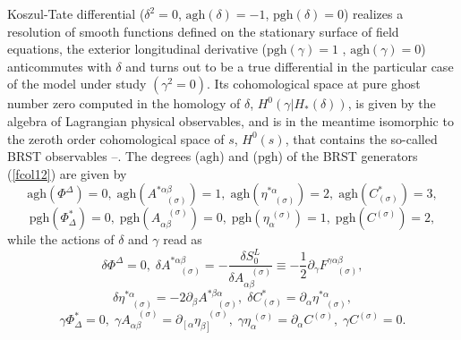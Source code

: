 \documentclass[a4paper,12pt]{article}
\begin{document}
Koszul-Tate differential ($\delta ^{2}=0$, $\mathrm{agh}\left( \delta
\right) =-1$, $\mathrm{pgh}\left( \delta \right) =0$) realizes a resolution
of smooth functions defined on the stationary surface of field equations,
the exterior longitudinal derivative ($\mathrm{pgh}\left( \gamma \right) =1$%
, $\mathrm{agh}\left( \gamma \right) =0$) anticommutes with $\delta $ and
turns out to be a true differential in the particular case of the model
under study $\left( \gamma ^{2}=0\right) $. Its cohomological space at pure
ghost number zero computed in the homology of $\delta $, $H^{0}\left( \gamma
|H_{*}\left( \delta \right) \right) $, is given by the algebra of Lagrangian
physical observables, and is in the meantime isomorphic to the zeroth order
cohomological space of $s$, $H^{0}\left( s\right) $, that contains the
so-called BRST observables \cite{33and13}--\cite{35and13}. The degrees ($%
\mathrm{agh}$) and ($\mathrm{pgh}$) of the BRST generators (\ref{fcol12})
are given by 
\begin{equation}
\mathrm{agh}\left( \Phi ^{\Delta }\right) =0,\;\mathrm{agh}\left(
A_{\;\;\;\;(\sigma )}^{*\alpha \beta }\right) =1,\;\mathrm{agh}\left( \eta
_{\;\;\;(\sigma )}^{*\alpha }\right) =2,\;\mathrm{agh}\left( C_{(\sigma
)}^{*}\right) =3,  \label{fcol17}
\end{equation}
\begin{equation}
\mathrm{pgh}\left( \Phi _{\Delta }^{*}\right) =0,\;\mathrm{pgh}\left(
A_{\alpha \beta }^{\;\;\;(\sigma )}\right) =0,\;\mathrm{pgh}\left( \eta
_{\alpha }^{\;(\sigma )}\right) =1,\;\mathrm{pgh}\left( C^{(\sigma )}\right)
=2,  \label{fcol18}
\end{equation}
while the actions of $\delta $ and $\gamma $ read as 
\begin{equation}
\delta \Phi ^{\Delta }=0,\;\delta A_{\;\;\;\;(\sigma )}^{*\alpha \beta }=-%
\frac{\delta S_{0}^{L}}{\delta A_{\alpha \beta }^{\;\;\;(\sigma )}}\equiv -%
\frac{1}{2}\partial _{\gamma }F_{\;\;\;\;(\sigma )}^{\gamma \alpha \beta },
\label{fcol19}
\end{equation}
\begin{equation}
\delta \eta _{\;\;\;(\sigma )}^{*\alpha }=-2\partial _{\beta
}A_{\;\;\;\;(\sigma )}^{*\beta \alpha },\;\delta C_{(\sigma )}^{*}=\partial
_{\alpha }\eta _{\;\;\;(\sigma )}^{*\alpha },  \label{fcol20}
\end{equation}
\begin{equation}
\gamma \Phi _{\Delta }^{*}=0,\;\gamma A_{\alpha \beta }^{\;\;\;(\sigma
)}=\partial _{\left[ \alpha \right. }\eta _{\left. \beta \right]
}^{\;\;\;(\sigma )},\;\gamma \eta _{\alpha }^{\;(\sigma )}=\partial _{\alpha
}C^{(\sigma )},\;\gamma C^{(\sigma )}=0.  \label{fcol21}
\end{equation}
\end{document}
